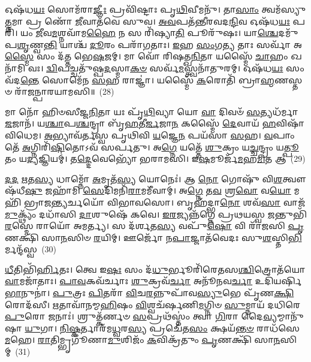 𑌓𑌷᳴𑌧\-\ul{𑌯𑌃} 𑌸𑍋𑌮᳴𑌰𑌾\-\ul{𑌜𑍍𑌞𑍀𑌃} 𑌪𑍍𑌰𑌵𑌿᳴𑌷𑍍𑌟𑌾𑌃 𑌪𑍃\-\ul{𑌥𑌿}\-𑌵𑍀𑌮𑌨𑍁᳴। 𑌤𑌾\-\ul{𑌸𑌾𑌂} 𑌤𑍍𑌵𑌮᳴𑌸𑍍𑌯𑍁\-\ul{𑌤𑍍𑌤}\-𑌮𑌾 𑌪𑍍𑌰 𑌣𑍋᳴ \ul{𑌜𑍀}\-𑌵𑌾𑌤᳴𑌵𑍇 𑌸𑍁𑌵। \ul{𑌅}\-\-\ul{𑌵}\-𑌪𑌤᳴𑌨𑍍𑌤𑍀𑌰𑌵𑌦\-\ul{𑌨𑍍𑌦𑌿}\-𑌵 𑌓𑌷᳴𑌧\-\ul{𑌯𑌃} 𑌪𑌰𑌿᳴। 𑌯𑌂 \ul{𑌜𑍀}\-𑌵\-\ul{𑌮}\-𑌶𑍍𑌨𑌵𑌾᳴𑌮\-\ul{𑌹𑍈} 𑌨 𑌸 𑌰𑌿᳴𑌷𑍍𑌯𑌾\-\ul{𑌤𑌿} 𑌪𑍂𑌰𑍁᳴𑌷𑌃। 𑌯𑌾\-\ul{𑌶𑍍𑌚𑍇}\-𑌦𑌮𑍁᳴𑌪\-\ul{𑌶𑍃}\-𑌣𑍍𑌵\-\ul{𑌨𑍍𑌤𑌿} 𑌯𑌾𑌶𑍍𑌚᳴ \ul{𑌦𑍂}\-𑌰𑌂 𑌪𑌰𑌾᳴𑌗𑌤𑌾𑌃। \ul{𑌇}\-𑌹 \ul{𑌸𑌂}\-𑌗\-\ul{𑌤𑍍𑌯} 𑌤𑌾𑌃 𑌸𑌰𑍍𑌵𑌾᳴ 𑌅\-\ul{𑌸𑍍𑌮𑍈} 𑌸𑌂 𑌦᳴𑌤𑍍𑌤 𑌭𑍇\-\ul{𑌷}\-𑌜𑌮𑍍। 𑌮𑌾 𑌵𑍋᳴ 𑌰𑌿𑌷𑌤𑍍𑌖\-\ul{𑌨𑌿}\-𑌤𑌾 𑌯𑌸𑍍𑌮𑍈᳴ \ul{𑌚𑌾}\-𑌹𑌂 𑌖𑌨𑌾᳴𑌮𑌿 𑌵𑌃। \ul{𑌦𑍍𑌵𑌿}\-𑌪𑌚𑍍𑌚𑌤𑍁᳴𑌷𑍍𑌪\-\ul{𑌦}\-𑌸𑍍𑌮𑌾\-\ul{𑌕}\-\-\ul{𑍞} 𑌸𑌰𑍍𑌵᳴\-\ul{𑌮}\-𑌸𑍍𑌤𑍍𑌵𑌨𑌾᳴𑌤𑍁𑌰𑌮𑍍। 𑌓𑌷᳴𑌧\-\ul{𑌯𑌃} 𑌸𑌂 𑌵᳴𑌦\-\ul{𑌨𑍍𑌤𑍇} 𑌸𑍋𑌮𑍇᳴𑌨 \ul{𑌸}\-𑌹 𑌰𑌾𑌜𑍍𑌞𑌾॑। 𑌯𑌸𑍍𑌮𑍈᳴ \ul{𑌕}\-𑌰𑍋𑌤𑌿᳴ 𑌬𑍍𑌰𑌾\-\ul{𑌹𑍍𑌮}\-𑌣𑌸𑍍𑌤𑍞 𑌰𑌾᳴𑌜𑌨𑍍𑌪𑌾𑌰𑌯𑌾𑌮𑌸𑌿॥~(28)

{\anuvakamend[{𑌰𑌪𑌃᳴ 𑌪\-\ul{𑌤}\-𑌤𑍍𑌰𑌿\-\ul{𑌣𑍀}\-𑌰𑍍𑌯𑌾 𑌅𑍞𑌹᳴\-\ul{𑌸𑍋} 𑌯𑌾𑌃 𑌖𑌨𑌾᳴𑌮𑌿 \ul{𑌵𑍋}\-\-𑌽𑌷𑍍𑌟𑌾𑌦᳴𑌶 𑌚}]}%

𑌮𑌾 𑌨𑍋᳴ 𑌹𑌿𑍞𑌸𑍀𑌜𑍍𑌜\-\ul{𑌨𑌿}\-𑌤𑌾 𑌯𑌃 𑌪𑍃᳴\-\ul{𑌥𑌿}\-𑌵𑍍𑌯𑌾 𑌯𑍋 \ul{𑌵𑌾} 𑌦𑌿𑌵𑍞᳴ \ul{𑌸}\-𑌤𑍍𑌯𑌧᳴𑌰𑍍𑌮𑌾 \ul{𑌜}\-𑌜𑌾𑌨᳴। 𑌯\-\ul{𑌶𑍍𑌚𑌾}\-𑌪\-\ul{𑌶𑍍𑌚}\-𑌨𑍍𑌦𑍍𑌰𑌾 𑌬𑍃᳴\-\ul{𑌹}\-𑌤𑍀\-\ul{𑌰𑍍𑌜}\-𑌜𑌾\-\ul{𑌨} 𑌕𑌸𑍍𑌮𑍈᳴ \ul{𑌦𑍇}\-𑌵𑌾𑌯᳴ \ul{𑌹}\-𑌵𑌿𑌷𑌾᳴ 𑌵𑌿𑌧𑍇𑌮। \ul{𑌅}\-𑌭𑍍𑌯𑌾𑌵᳴𑌰𑍍𑌤𑌸𑍍𑌵 𑌪𑍃𑌥𑌿𑌵𑌿 \ul{𑌯}\-𑌜𑍍𑌞𑍇\-\ul{𑌨} 𑌪𑌯᳴𑌸𑌾 \ul{𑌸}\-𑌹। \ul{𑌵}\-𑌪𑌾𑌂 𑌤𑍇᳴ \ul{𑌅}\-𑌗𑍍𑌨𑌿𑌰𑌿᳴\-\ul{𑌷𑌿}\-𑌤𑍋\-𑌽𑌵᳴ 𑌸𑌰𑍍𑌪𑌤𑍁। 𑌅\-\ul{𑌗𑍍𑌨𑍇} 𑌯𑌤𑍍𑌤𑍇᳴ \ul{𑌶𑍁}\-𑌕𑍍𑌰𑌂 𑌯\-\ul{𑌚𑍍𑌚}\-𑌨𑍍𑌦𑍍𑌰𑌂 𑌯\-\ul{𑌤𑍍𑌪𑍂}\-𑌤𑌂 𑌯\-\ul{𑌦𑍍𑌯}\-𑌜𑍍𑌞𑌿𑌯𑌮𑍍॑। 𑌤\-\ul{𑌦𑍍𑌦𑍇}\-𑌵𑍇𑌭𑍍𑌯𑍋᳴ 𑌭𑌰𑌾𑌮𑌸𑌿। 𑌇\-\ul{𑌷}\-𑌮𑍂𑌰𑍍𑌜᳴\-\ul{𑌮}\-𑌹\-\ul{𑌮𑌿}\-𑌤 𑌆~(29)

\-\ul{𑌦}\-\-\ul{𑌦} \ul{𑌋}\-𑌤\-\ul{𑌸𑍍𑌯} 𑌧𑌾𑌮𑍍𑌨𑍋᳴ \ul{𑌅}\-𑌮𑍃𑌤᳴\-\ul{𑌸𑍍𑌯} 𑌯𑍋𑌨𑍇𑌃॑। 𑌆 \ul{𑌨𑍋} 𑌗𑍋𑌷𑍁᳴ 𑌵𑌿\-\ul{𑌶}\-𑌤𑍍𑌵𑍗𑌷᳴𑌧𑍀\-\ul{𑌷𑍁} 𑌜𑌹𑌾᳴𑌮𑌿 \ul{𑌸𑍇}\-𑌦𑌿𑌮𑌨𑌿᳴\-\ul{𑌰𑌾}\-𑌮𑌮𑍀᳴𑌵𑌾𑌮𑍍। 𑌅\-\ul{𑌗𑍍𑌨𑍇} 𑌤\-\ul{𑌵} 𑌶𑍍𑌰\-\ul{𑌵𑍋} 𑌵\-\ul{𑌯𑍋} 𑌮𑌹𑌿᳴ 𑌭𑍍𑌰𑌾𑌜\-\ul{𑌨𑍍𑌤𑍍𑌯}\-𑌰𑍍𑌚𑌯𑍋᳴ 𑌵𑌿𑌭𑌾𑌵𑌸𑍋। 𑌬𑍃𑌹᳴𑌦𑍍𑌭𑌾\-\ul{𑌨𑍋} 𑌶𑌵᳴\-\ul{𑌸𑌾} 𑌵𑌾𑌜᳴\-\ul{𑌮𑍁}\-𑌕𑍍𑌥𑍍𑌯𑌂᳴ 𑌦𑌧𑌾᳴𑌸𑌿 \ul{𑌦𑌾}\-𑌶𑍁𑌷𑍇᳴ 𑌕𑌵𑍇। \ul{𑌇}\-\-\ul{𑌰}\-𑌜𑍍𑌯𑌨𑍍𑌨᳴𑌗𑍍𑌨𑍇 𑌪𑍍𑌰𑌥𑌯𑌸𑍍𑌵 \ul{𑌜}\-𑌨𑍍𑌤𑍁𑌭𑌿᳴\-\ul{𑌰}\-𑌸𑍍𑌮𑍇 𑌰𑌾𑌯𑍋᳴ 𑌅𑌮𑌰𑍍𑌤𑍍𑌯। 𑌸 𑌦᳴𑌰𑍍\mbox{}\-\ul{𑌶}\-𑌤\-\ul{𑌸𑍍𑌯} 𑌵𑌪𑍁᳴\-\ul{𑌷𑍋} 𑌵𑌿 𑌰𑌾᳴𑌜𑌸𑌿 \ul{𑌪𑍃}\-𑌣𑌕𑍍𑌷𑌿᳴ 𑌸𑌾\-\ul{𑌨}\-𑌸𑌿𑍞 \ul{𑌰}\-𑌯𑌿𑌮𑍍। 𑌊𑌰𑍍𑌜𑍋᳴ 𑌨\-\ul{𑌪𑌾}\-𑌜𑍍𑌜𑌾𑌤᳴𑌵𑍇𑌦𑌃 𑌸𑍁\-\ul{𑌶}\-𑌸𑍍𑌤𑌿\-\ul{𑌭𑌿}\-𑌰𑍍𑌮𑌨𑍍𑌦᳴𑌸𑍍𑌵~(30)

\-\ul{𑌧𑍀}\-𑌤𑌿𑌭𑌿᳴\-\ul{𑌰𑍍𑌹𑌿}\-𑌤𑌃। 𑌤𑍍𑌵𑍇 𑌇\-\ul{𑌷𑌃} 𑌸𑌂 𑌦᳴\-\ul{𑌧𑍁}\-𑌰𑍍𑌭𑍂𑌰𑌿᳴𑌰𑍇𑌤𑌸\-\ul{𑌶𑍍𑌚𑌿}\-𑌤𑍍𑌰𑍋𑌤᳴𑌯𑍋 \ul{𑌵𑌾}\-𑌮𑌜𑌾᳴𑌤𑌾𑌃। \ul{𑌪𑌾}\-\-\ul{𑌵}\-𑌕𑌵᳴𑌰𑍍𑌚𑌾𑌃 \ul{𑌶𑍁}\-𑌕𑍍𑌰𑌵᳴\-\ul{𑌰𑍍𑌚𑌾} 𑌅𑌨𑍂᳴𑌨𑌵\-\ul{𑌰𑍍𑌚𑌾} 𑌉𑌦𑌿᳴𑌯𑌰𑍍\mbox{}𑌷𑌿 \ul{𑌭𑌾}\-𑌨𑍁𑌨𑌾॑। \ul{𑌪𑍁}\-𑌤𑍍𑌰𑌃 \ul{𑌪𑌿}\-𑌤𑌰𑌾᳴ \ul{𑌵𑌿}\-𑌚\-\ul{𑌰}\-𑌨𑍍𑌨𑍁𑌪𑌾᳴𑌵\-\ul{𑌸𑍍𑌯𑍁}\-𑌭𑍇 𑌪𑍃᳴𑌣\-\ul{𑌕𑍍𑌷𑌿} 𑌰𑍋𑌦᳴𑌸𑍀। \ul{𑌋}\-𑌤𑌾𑌵𑌾᳴𑌨𑌮𑍍𑌮\-\ul{𑌹𑌿}\-𑌷𑌂 \ul{𑌵𑌿}\-𑌶𑍍𑌵𑌚᳴𑌰𑍍\mbox{}𑌷𑌣𑌿\-\ul{𑌮}\-𑌗𑍍𑌨𑌿𑍞 \ul{𑌸𑍁}\-𑌮𑍍𑌨𑌾𑌯᳴ 𑌦𑌧𑌿𑌰𑍇 \ul{𑌪𑍁}\-𑌰𑍋 𑌜𑌨𑌾𑌃॑। 𑌶𑍍𑌰𑍁𑌤𑍍𑌕᳴𑌰𑍍𑌣𑍞 \ul{𑌸}\-𑌪𑍍𑌰𑌥᳴𑌸𑍍𑌤𑌂॑ 𑌤𑍍𑌵𑌾 \ul{𑌗𑌿}\-𑌰𑌾 𑌦𑍈\-\ul{𑌵𑍍𑌯}\-𑌮𑍍𑌮𑌾𑌨𑍁᳴𑌷𑌾 \ul{𑌯𑍁}\-𑌗𑌾। \ul{𑌨𑌿}\-\-\ul{𑌷𑍍𑌕}\-𑌰𑍍𑌤𑌾𑌰᳴𑌮\-\ul{𑌧𑍍𑌵}\-𑌰\-\ul{𑌸𑍍𑌯} 𑌪𑍍𑌰𑌚𑍇᳴𑌤\-\ul{𑌸𑌂} 𑌕𑍍𑌷𑌯᳴\-\ul{𑌨𑍍𑌤}\-\-\ul{𑍞} 𑌰𑌾𑌧᳴𑌸𑍇 \ul{𑌮}\-𑌹𑍇। \ul{𑌰𑌾}\-𑌤𑌿𑌮𑍍𑌭𑍃𑌗𑍂᳴𑌣𑌾\-\ul{𑌮𑍁}\-𑌶𑌿𑌜𑌂᳴ \ul{𑌕}\-𑌵𑌿𑌕𑍍𑌰᳴𑌤𑍁𑌂 \ul{𑌪𑍃}\-𑌣𑌕𑍍𑌷𑌿᳴ 𑌸𑌾\-\ul{𑌨}\-𑌸𑌿𑌮𑍍~(31)


